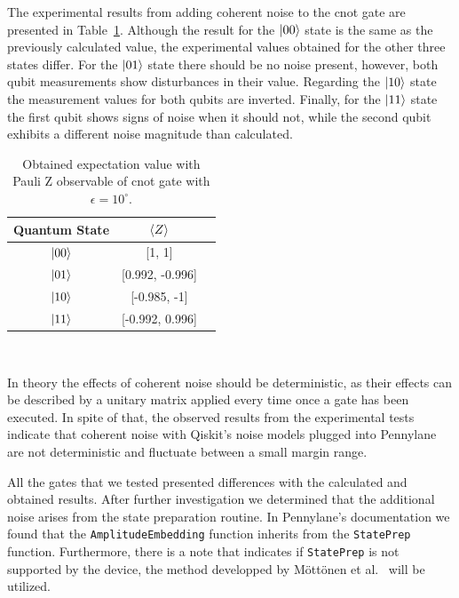 The experimental results from adding coherent noise to the
\ac{cnot} gate are presented in Table~\ref{tab:cnot_real_noise}.
Although the result for the \(\ket{00}\) state is the same as the
previously calculated value, the experimental values obtained for
the other three states differ. For the \(\ket{01}\) state there
should be no noise present, however, both qubit measurements
show disturbances in their value. Regarding the \(\ket{10}\) state
the measurement values for both qubits are inverted. Finally,
for the \(\ket{11}\) state the first qubit shows signs of noise
when it should not, while the second qubit exhibits a different noise
magnitude than calculated. \

\begin{table}[h]
  \centering
  \begin{tabular}{|c|c|c|}
    \hline
    Quantum State & \(\expval{Z}\) \\
    \hline
    \(\ket{00}\) & [1, 1] \\
    \hline
    \(\ket{01}\) & [0.992, -0.996] \\
    \hline
    \(\ket{10}\) & [-0.985, -1] \\
    \hline
    \(\ket{11}\) & [-0.992, 0.996] \\
    \hline
  \end{tabular}
  \caption{Obtained expectation value with Pauli Z observable of \ac{cnot} gate with \(\epsilon = 10^{\circ}\).}\label{tab:cnot_real_noise}
\end{table} \

In theory the effects of coherent noise should be deterministic,
as their effects can be described by a unitary matrix applied
every time once a gate has been executed. In spite of that,
the observed results from the experimental tests indicate that
coherent noise with Qiskit's noise models plugged into Pennylane
are not deterministic and fluctuate between a small margin range. \

All the gates that we tested presented differences with the
calculated and obtained results. After further investigation
we determined that the additional noise arises from the state
preparation routine. In Pennylane's documentation we found that
the \colorbox{inline_gray}{\lstinline|AmplitudeEmbedding|} function
inherits from the \colorbox{inline_gray}{\lstinline|StatePrep|}
function. Furthermore, there is a note that indicates
if \colorbox{inline_gray}{\lstinline|StatePrep|} is not supported
by the device, the method developped by Möttönen et al.~\cite{mottonen_transformation_2004}
will be utilized. \

